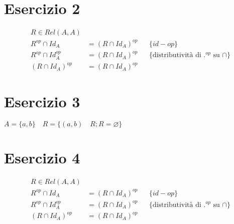 \documentclass{article}
\begin{document}
\section{Esercizio 2}
\begin{align*}
    R \in Rel(A,A) \\
    R^{op} \cap Id_A &= (R \cap Id_A)^{op} && \{id-op\} \\
    R^{op} \cap Id_A^{op} &= (R \cap Id_A)^{op} && \{\text{distributività di }.^{op} \text{ su } \cap\} \\
    (R \cap Id_A)^{op} &= (R \cap Id_A)^{op}
\end{align*}

\section{Esercizio 3}
\(A = \{a,b\} \quad R = \{(a,b) \quad R;R = \varnothing\}\)

\section{Esercizio 4}
\begin{align*}
    R \in Rel(A,A) \\
    R^{op} \cap Id_A &= (R \cap Id_A)^{op} && \{id-op\} \\
    R^{op} \cap Id_A^{op} &= (R \cap Id_A)^{op} && \{\text{distributività di }.^{op} \text{ su } \cap\} \\
    (R \cap Id_A)^{op} &= (R \cap Id_A)^{op}
\end{align*}
\end{document}
